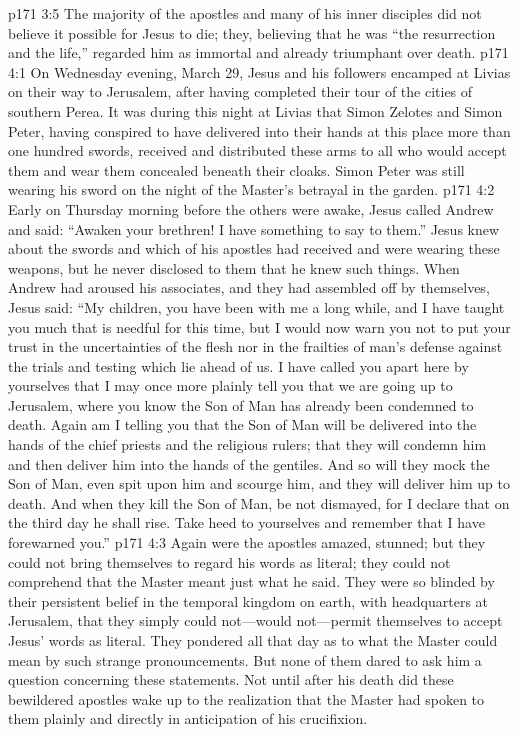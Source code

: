 \vs p171 3:5 The majority of the apostles and many of his inner disciples did not believe it possible for Jesus to die; they, believing that he was “the resurrection and the life,” regarded him as immortal and already triumphant over death.
\vs p171 4:1 On Wednesday evening, March 29, Jesus and his followers encamped at Livias on their way to Jerusalem, after having completed their tour of the cities of southern Perea. It was during this night at Livias that Simon Zelotes and Simon Peter, having conspired to have delivered into their hands at this place more than one hundred swords, received and distributed these arms to all who would accept them and wear them concealed beneath their cloaks. Simon Peter was still wearing his sword on the night of the Master’s betrayal in the garden.
\vs p171 4:2 Early on Thursday morning before the others were awake, Jesus called Andrew and said: \textcolor{ubdarkred}{“Awaken your brethren! I have something to say to them.”} Jesus knew about the swords and which of his apostles had received and were wearing these weapons, but he never disclosed to them that he knew such things. When Andrew had aroused his associates, and they had assembled off by themselves, Jesus said: \textcolor{ubdarkred}{“My children, you have been with me a long while, and I have taught you much that is needful for this time, but I would now warn you not to put your trust in the uncertainties of the flesh nor in the frailties of man’s defense against the trials and testing which lie ahead of us. I have called you apart here by yourselves that I may once more plainly tell you that we are going up to Jerusalem, where you know the Son of Man has already been condemned to death. Again am I telling you that the Son of Man will be delivered into the hands of the chief priests and the religious rulers; that they will condemn him and then deliver him into the hands of the gentiles. And so will they mock the Son of Man, even spit upon him and scourge him, and they will deliver him up to death. And when they kill the Son of Man, be not dismayed, for I declare that on the third day he shall rise. Take heed to yourselves and remember that I have forewarned you.”}
\vs p171 4:3 Again were the apostles amazed, stunned; but they could not bring themselves to regard his words as literal; they could not comprehend that the Master meant just what he said. They were so blinded by their persistent belief in the temporal kingdom on earth, with headquarters at Jerusalem, that they simply could not---would not---permit themselves to accept Jesus’ words as literal. They pondered all that day as to what the Master could mean by such strange pronouncements. But none of them dared to ask him a question concerning these statements. Not until after his death did these bewildered apostles wake up to the realization that the Master had spoken to them plainly and directly in anticipation of his crucifixion.
